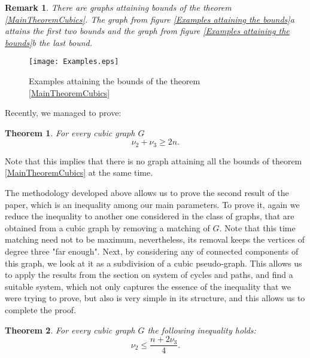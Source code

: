\documentclass[fleqn,12pt,twoside]{article}
\newtheorem{theorem}{Theorem}
\newtheorem{remark}{Remark}
\begin{document}
\begin{remark}
There are graphs attaining bounds of the theorem
\ref{MainTheoremCubics}. The graph from figure \ref{Examples
attaining the bounds}a attains the first two bounds and the graph
from figure \ref{Examples attaining the bounds}b the last bound.
\end{remark}

\begin{center}
\begin{figure}[h]
\begin{center}
\texttt{[image: Examples.eps]}\\
\caption{Examples attaining the bounds of the theorem
\protect\ref{MainTheoremCubics}}\label{Examples attaining the
bounds}
\end{center}
\end{figure}
\end{center}

Recently, we managed to prove:

\begin{theorem}
For every cubic graph $G$\begin{equation*}
\nu _{2}+\nu _{3}\geq 2n.
\end{equation*}
\end{theorem}

Note that this implies that there is no graph attaining
all the bounds of theorem \ref{MainTheoremCubics} at the same time.

The methodology developed above allows us to prove the second result
of the paper, which is an inequality among our main parameters. To
prove it, again we reduce the inequality to another one considered
in the class of graphs, that are obtained from a cubic graph by
removing a matching of $G$. Note that this time matching need not to
be maximum, nevertheless, its removal keeps the vertices of degree
three "far enough". Next, by considering any of connected components
of this graph, we look at it as a subdivision of a cubic
pseudo-graph. This allows us to apply the results from the section
on system of cycles and paths, and find a suitable system, which not
only captures the essence of the inequality that we were trying to
prove, but also is very simple in its structure, and this allows us
to complete the proof.

\begin{theorem}
\label{ArithmeticalMean}For every cubic graph $G$ the following inequality holds:\begin{equation*}
\nu _{2}\leq \frac{n+2\nu _{3}}{4}.
\end{equation*}
\end{theorem}
\end{document}
